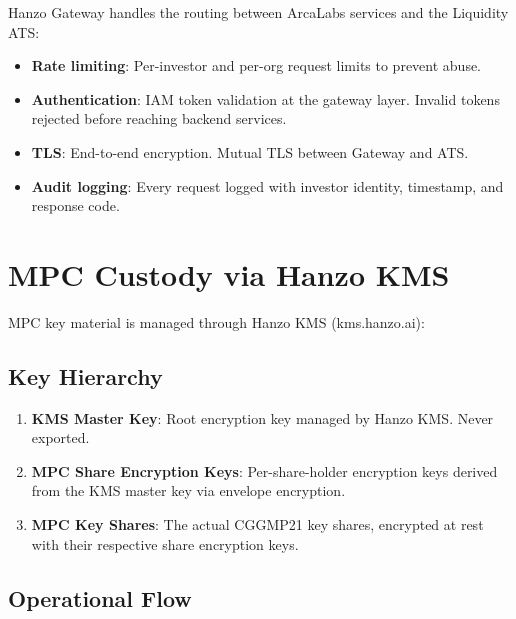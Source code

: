 \documentclass[11pt]{article}
\begin{document}
Hanzo Gateway handles the routing between ArcaLabs services and the
Liquidity ATS:

\begin{itemize}[leftmargin=1.4em]
    \item \textbf{Rate limiting}: Per-investor and per-org request limits
    to prevent abuse.
    \item \textbf{Authentication}: IAM token validation at the gateway
    layer. Invalid tokens rejected before reaching backend services.
    \item \textbf{TLS}: End-to-end encryption. Mutual TLS between
    Gateway and ATS.
    \item \textbf{Audit logging}: Every request logged with investor
    identity, timestamp, and response code.
\end{itemize}

\section{MPC Custody via Hanzo KMS}
\label{sec:custody}

MPC key material is managed through Hanzo KMS (kms.hanzo.ai):

\subsection{Key Hierarchy}

\begin{enumerate}[leftmargin=1.4em]
    \item \textbf{KMS Master Key}: Root encryption key managed by Hanzo
    KMS. Never exported.
    \item \textbf{MPC Share Encryption Keys}: Per-share-holder encryption
    keys derived from the KMS master key via envelope encryption.
    \item \textbf{MPC Key Shares}: The actual CGGMP21 key shares,
    encrypted at rest with their respective share encryption keys.
\end{enumerate}

\subsection{Operational Flow}
\end{document}
